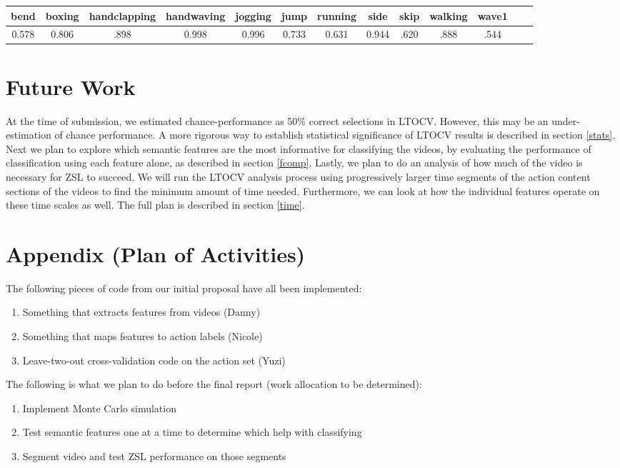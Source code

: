 \documentclass{article}
\begin{document}
\begin{tabular}{|c|c|c|c|c|c|c|c|c|c|c|c|c|}\hline
  bend &  boxing & handclapping & handwaving & jogging & jump  & running &  side  & skip & walking & wave1 \\\hline
  0.578 & 0.806  & .898         & 0.998      & 0.996  &  0.733 & 0.631   &  0.944 & .620 & .888    & .544 \\\hline
\end{tabular}

\section{Future Work} %
At the time of submission, we estimated chance-performance as 50\% correct selections in LTOCV.  However, this may be an under-estimation of chance performance. A more rigorous way to establish statistical significance of LTOCV results is described in section \ref{stats}. 
Next we plan to explore which semantic features are the most informative for classifying the videos, by evaluating the performance of classification using each feature alone, as described in section \ref{fcomp}.
Lastly, we plan to do an analysis of how much of the video is necessary for ZSL to succeed. We will run the LTOCV analysis process using progressively larger time segments of the action content sections of the videos to find the minimum amount of time needed. Furthermore, we can look at how the individual features operate on these time scales as well. The full plan is described in section \ref{time}.

\section*{Appendix (Plan of Activities)}
The following pieces of code from our initial proposal have all been implemented:
\begin{enumerate}
\item Something that extracts features from videos (Danny)
\item Something that maps features to action labels (Nicole)
\item Leave-two-out cross-validation code on the action set (Yuzi)
\end{enumerate}
The following is what we plan to do before the final report (work allocation to be determined):
\begin{enumerate}
\item Implement Monte Carlo simulation
\item Test semantic features one at a time to determine which help with classifying
\item Segment video and test ZSL performance on those segments
\end{enumerate}



\end{document}
